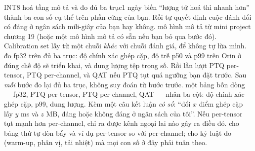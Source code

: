 \documentclass[../../deep_learning.tex]{subfiles}
\begin{document}
\begin{ungdung}
\end{ungdung}

\begin{duan}{INT8 hoá tầng mô tả và đo đủ ba trục}{1 ngày}
\dmt biến ``lượng tử hoá thì nhanh hơn'' thành ba con số cụ thể trên phần cứng của bạn. Rồi tự quyết định cuộc đánh đổi có đáng ở ngân sách mili-giây của bạn hay không.
\ddl mô hình mô tả từ mini project chương 19 (hoặc một mô hình mô tả có sẵn nếu bạn bỏ qua bước đó). Calibration set lấy từ một chuỗi \emph{khác} với chuỗi đánh giá, để không tự lừa mình.
\dbc đo  fp32 trên đủ ba trục: độ chính xác ghép cặp, độ trễ p50 và p99 trên Orin ở đúng chế độ  sẽ triển khai, và dung lượng tệp trọng số. Rồi lần lượt PTQ per-tensor, PTQ per-channel, và QAT nếu PTQ tụt quá ngưỡng bạn đặt trước. Sau \emph{mỗi} bước đo lại đủ ba trục, không suy đoán từ bước trước.
\dxk một bảng bốn dòng --- fp32, PTQ per-tensor, PTQ per-channel, QAT --- nhân ba cột: độ chính xác ghép cặp, p99, dung lượng. Kèm một câu kết luận \emph{có số}: ``đổi $x$ điểm ghép cặp lấy $y$ ms và $z$ MB, đáng hoặc không đáng ở ngân sách của tôi''. Nếu per-tensor tụt mạnh hơn per-channel, chỉ ra được kênh ngoại lai nào gây ra điều đó.
\dnv {} cho bảng thứ tự đòn bẩy và ví dụ per-tensor so với per-channel;  cho kỷ luật đo (warm-up, phân vị, tải nhiệt) mà mọi con số ở đây phải tuân theo.
\end{duan}
\end{document}
